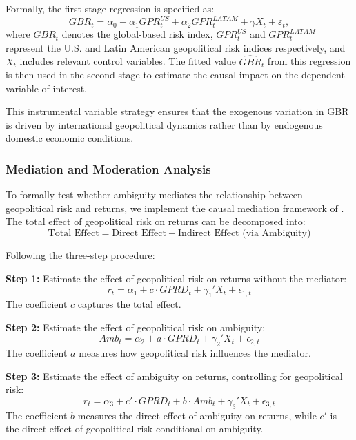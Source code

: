 \documentclass[preprint,12pt,authoryear]{elsarticle}
\begin{document}
Formally, the first-stage regression is specified as:
\begin{equation}
GBR_{t} = \alpha_0 + \alpha_1 GPR^{US}_{t} + \alpha_2 GPR^{LATAM}_{t} + \gamma X_{t} + \varepsilon_{t},
\end{equation}
where $GBR_t$ denotes the global-based risk index, $GPR^{US}_t$ and $GPR^{LATAM}_t$ represent the U.S. and Latin American geopolitical risk indices respectively, and $X_t$ includes relevant control variables. The fitted value $\widehat{GBR}_t$ from this regression is then used in the second stage to estimate the causal impact on the dependent variable of interest.

This instrumental variable strategy ensures that the exogenous variation in GBR is driven by international geopolitical dynamics rather than by endogenous domestic economic conditions.

\subsubsection{Mediation and Moderation Analysis}

To formally test whether ambiguity mediates the relationship between geopolitical risk and returns, we implement the causal mediation framework of \citet{baron1986moderator}. The total effect of geopolitical risk on returns can be decomposed into:
\begin{equation}
\text{Total Effect} = \text{Direct Effect} + \text{Indirect Effect (via Ambiguity)}
\end{equation}

Following the three-step procedure:

\textbf{Step 1:} Estimate the effect of geopolitical risk on returns without the mediator:
\begin{equation}
r_t = \alpha_1 + c \cdot GPRD_t + \gamma_1' X_t + \epsilon_{1,t}
\end{equation}
The coefficient $c$ captures the total effect.

\textbf{Step 2:} Estimate the effect of geopolitical risk on ambiguity:
\begin{equation}
Amb_t = \alpha_2 + a \cdot GPRD_t + \gamma_2' X_t + \epsilon_{2,t}
\end{equation}
The coefficient $a$ measures how geopolitical risk influences the mediator.

\textbf{Step 3:} Estimate the effect of ambiguity on returns, controlling for geopolitical risk:
\begin{equation}
r_t = \alpha_3 + c' \cdot GPRD_t + b \cdot Amb_t + \gamma_3' X_t + \epsilon_{3,t}
\end{equation}
The coefficient $b$ measures the direct effect of ambiguity on returns, while $c'$ is the direct effect of geopolitical risk conditional on ambiguity.
\end{document}
